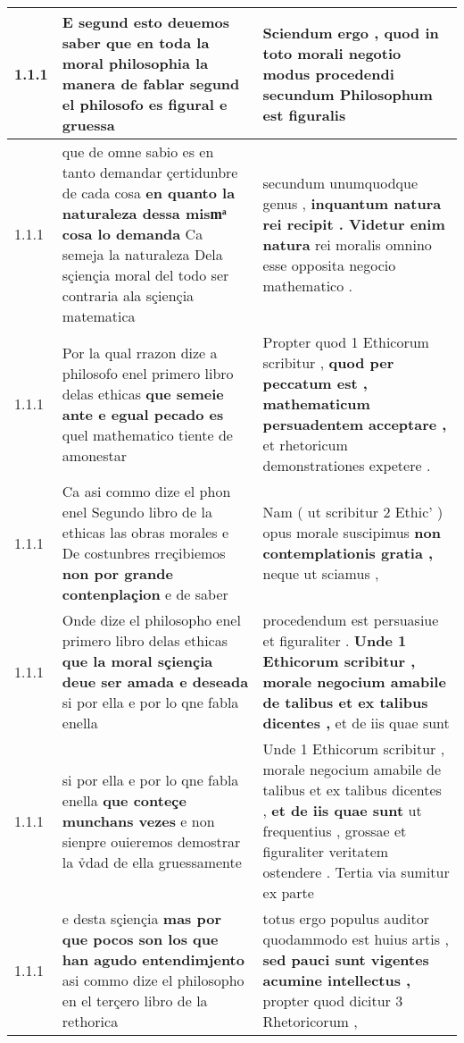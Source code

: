 \begin{tabular}{|p{1cm}|p{6.5cm}|p{6.5cm}|}

\hline
1.1.1 & E segund esto deuemos saber \textbf{ que en toda la moral philosophia la manera de fablar } segund el philosofo es figural e gruessa & Sciendum ergo , \textbf{ quod in toto morali negotio modus procedendi } secundum Philosophum est figuralis \\\hline
1.1.1 & que de omne sabio es en tanto demandar çertidunbre de cada cosa \textbf{ en quanto la naturaleza dessa mismͣ cosa lo demanda } Ca semeja la naturaleza Dela sçiençia moral del todo ser contraria ala sçiençia matematica & secundum unumquodque genus , \textbf{ inquantum natura rei recipit . Videtur enim natura } rei moralis omnino esse opposita negocio mathematico . \\\hline
1.1.1 & Por la qual rrazon dize a philosofo enel primero libro delas ethicas \textbf{ que semeie ante e egual pecado es } quel mathematico tiente de amonestar & Propter quod 1 Ethicorum scribitur , \textbf{ quod per peccatum est , mathematicum persuadentem acceptare , } et rhetoricum demonstrationes expetere . \\\hline
1.1.1 & Ca asi commo dize el phon enel Segundo libro de la ethicas las obras morales e De costunbres rreçibiemos \textbf{ non por grande contenplaçion } e de saber & Nam ( ut scribitur 2 Ethic’ ) opus morale suscipimus \textbf{ non contemplationis gratia , } neque ut sciamus , \\\hline
1.1.1 & Onde dize el philosopho enel primero libro delas ethicas \textbf{ que la moral sçiençia deue ser amada e deseada } si por ella e por lo qne fabla enella & procedendum est persuasiue et figuraliter . \textbf{ Unde 1 Ethicorum scribitur , morale negocium amabile de talibus et ex talibus dicentes , } et de iis quae sunt \\\hline
1.1.1 & si por ella e por lo qne fabla enella \textbf{ que conteçe munchans vezes } e non sienpre ouieremos demostrar la v̉dad de ella gruessamente & Unde 1 Ethicorum scribitur , morale negocium amabile de talibus et ex talibus dicentes , \textbf{ et de iis quae sunt } ut frequentius , grossae et figuraliter veritatem ostendere . Tertia via sumitur ex parte \\\hline
1.1.1 & e desta sçiençia \textbf{ mas por que pocos son los que han agudo entendimjento } asi commo dize el philosopho en el terçero libro de la rethorica & totus ergo populus auditor quodammodo est huius artis , \textbf{ sed pauci sunt vigentes acumine intellectus , } propter quod dicitur 3 Rhetoricorum , \\\hline

\end{tabular}
